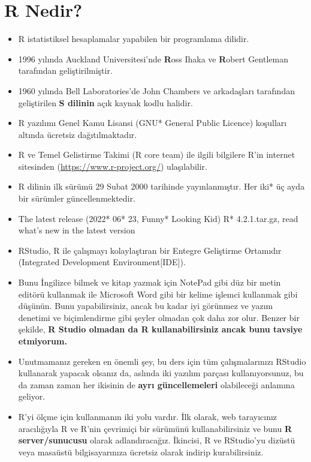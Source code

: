 \documentclass[
  oneside]{book}
\begin{document}
\hypertarget{r-nedir}{%
\section{R Nedir?}\label{r-nedir}}

\begin{itemize}
\item
  R istatistiksel hesaplamalar yapabilen bir programlama dilidir.
\item
  1996 yılında Auckland Universitesi'nde \textbf{R}oss Ihaka ve \textbf{R}obert Gentleman tarafından geliştirilmiştir.
\item
  1960 yılında Bell Laboratories'de John Chambers ve arkadaşları tarafından geliştirilen \textbf{S dilinin} açık kaynak kodlu halidir.
\item
  R yazılımı Genel Kamu Lisansi (GNU* General Public Licence) koşulları altında ücretsiz dağıtılmaktadır.
\item
  R ve Temel Gelistirme Takimi (R core team) ile ilgili bilgilere R'in internet sitesinden (\url{https://www.r-project.org/}) ulaşılabilir.
\item
  R dilinin ilk sürümü 29 Subat 2000 tarihinde yayınlanmıştır. Her iki* üç ayda bir sürümler güncellenmektedir.
\item
  The latest release (2022* 06* 23, Funny* Looking Kid) R* 4.2.1.tar.gz, read what's new in the latest version
\item
  RStudio, R ile çalışmayı kolaylaştıran bir Entegre Geliştirme Ortamıdır (Integrated Development Environment{[}IDE{]}).
\item
  Bunu İngilizce bilmek ve kitap yazmak için NotePad gibi düz bir metin editörü kullanmak ile Microsoft Word gibi bir kelime işlemci kullanmak gibi düşünün. Bunu yapabilirsiniz, ancak bu kadar iyi görünmez ve yazım denetimi ve biçimlendirme gibi şeyler olmadan çok daha zor olur. Benzer bir şekilde, \textbf{R Studio olmadan da R kullanabilirsiniz ancak bunu tavsiye etmiyorum.}
\item
  Unutmamanız gereken en önemli şey, bu ders için tüm çalışmalarınızı RStudio kullanarak yapacak olsanız da, aslında iki yazılım parçası kullanıyorsunuz, bu da zaman zaman her ikisinin de \textbf{ayrı güncellemeleri} olabileceği anlamına geliyor.
\item
  R'yi ölçme için kullanmanın iki yolu vardır. İlk olarak, web tarayıcınız aracılığıyla R ve R'nin çevrimiçi bir sürümünü kullanabilirsiniz ve bunu \textbf{R server/sunucusu} olarak adlandıracağız. İkincisi, R ve RStudio'yu dizüstü veya masaüstü bilgisayarınıza ücretsiz olarak indirip kurabilirsiniz.
\end{itemize}
\end{document}
